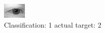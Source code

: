 \begin{figure}[h!]
\begin{center}
\includegraphics[width=0.60\columnwidth]{figures/ID344_class_1_target_2.png}
\end{center}
\caption{ Classification: 1 actual target: 2}
\label{fig:ID344_class_1_target_2}
\end{figure}
